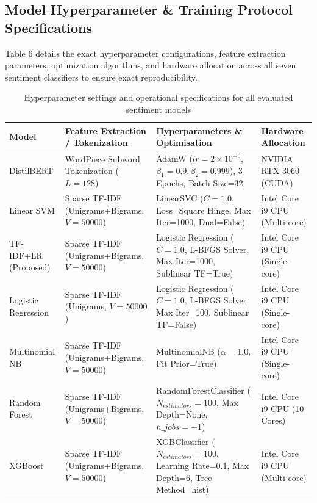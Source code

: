 \documentclass[11pt]{article}
\begin{document}
\subsection{Model Hyperparameter \& Training Protocol Specifications}
Table 6 details the exact hyperparameter configurations, feature extraction parameters, optimization algorithms, and hardware allocation across all seven sentiment classifiers to ensure exact reproducibility.

\begin{table}[H]
\centering
\small
\caption{Hyperparameter settings and operational specifications for all evaluated sentiment models}
\label{tab:supp_hyperparameters}
\begin{tabular}{p{2cm}p{4cm}p{4.5cm}l}
\toprule
\textbf{Model} & \textbf{Feature Extraction / Tokenization} & \textbf{Hyperparameters \& Optimisation} & \textbf{Hardware Allocation} \\ 
\midrule
DistilBERT & WordPiece Subword Tokenization ($L=128$) & AdamW ($lr=2\times 10^{-5}$, $\beta_1=0.9, \beta_2=0.999$), 3 Epochs, Batch Size=32 & NVIDIA RTX 3060 (CUDA) \\
Linear SVM & Sparse TF-IDF (Unigrams+Bigrams, $V=50000$) & LinearSVC ($C=1.0$, Loss=Square Hinge, Max Iter=1000, Dual=False) & Intel Core i9 CPU (Multi-core) \\
TF-IDF+LR (Proposed) & Sparse TF-IDF (Unigrams+Bigrams, $V=50000$) & Logistic Regression ($C=1.0$, L-BFGS Solver, Max Iter=1000, Sublinear TF=True) & Intel Core i9 CPU (Single-core) \\
Logistic Regression & Sparse TF-IDF (Unigrams, $V=50000$) & Logistic Regression ($C=1.0$, L-BFGS Solver, Max Iter=100, Sublinear TF=False) & Intel Core i9 CPU (Single-core) \\
Multinomial NB & Sparse TF-IDF (Unigrams+Bigrams, $V=50000$) & MultinomialNB ($\alpha=1.0$, Fit Prior=True) & Intel Core i9 CPU (Single-core) \\
Random Forest & Sparse TF-IDF (Unigrams+Bigrams, $V=50000$) & RandomForestClassifier ($N_{estimators}=100$, Max Depth=None, $n\_jobs=-1$) & Intel Core i9 CPU (10 Cores) \\
XGBoost & Sparse TF-IDF (Unigrams+Bigrams, $V=50000$) & XGBClassifier ($N_{estimators}=100$, Learning Rate=0.1, Max Depth=6, Tree Method=hist) & Intel Core i9 CPU (Multi-core) \\
\bottomrule
\end{tabular}
\end{table}
\end{document}
